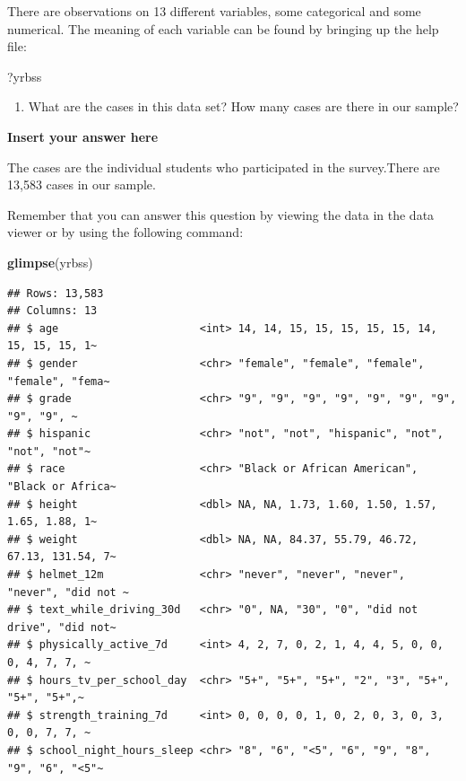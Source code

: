 \documentclass[
]{article}
\newenvironment{Shaded}{\begin{snugshade}}{\end{snugshade}}
\newcommand{\FunctionTok}[1]{\textcolor[rgb]{0.13,0.29,0.53}{\textbf{#1}}}
\newcommand{\NormalTok}[1]{#1}
\providecommand{\tightlist}{%
  \setlength{\itemsep}{0pt}\setlength{\parskip}{0pt}}
\begin{document}
There are observations on 13 different variables, some categorical and
some numerical. The meaning of each variable can be found by bringing up
the help file:

\begin{Shaded}
\begin{Highlighting}[]
\NormalTok{?yrbss}
\end{Highlighting}
\end{Shaded}

\begin{enumerate}
\def\labelenumi{\arabic{enumi}.}
\tightlist
\item
  What are the cases in this data set? How many cases are there in our
  sample?
\end{enumerate}

\textbf{Insert your answer here}

The cases are the individual students who participated in the
survey.There are 13,583 cases in our sample.

Remember that you can answer this question by viewing the data in the
data viewer or by using the following command:

\begin{Shaded}
\begin{Highlighting}[]
\FunctionTok{glimpse}\NormalTok{(yrbss)}
\end{Highlighting}
\end{Shaded}

\begin{verbatim}
## Rows: 13,583
## Columns: 13
## $ age                      <int> 14, 14, 15, 15, 15, 15, 15, 14, 15, 15, 15, 1~
## $ gender                   <chr> "female", "female", "female", "female", "fema~
## $ grade                    <chr> "9", "9", "9", "9", "9", "9", "9", "9", "9", ~
## $ hispanic                 <chr> "not", "not", "hispanic", "not", "not", "not"~
## $ race                     <chr> "Black or African American", "Black or Africa~
## $ height                   <dbl> NA, NA, 1.73, 1.60, 1.50, 1.57, 1.65, 1.88, 1~
## $ weight                   <dbl> NA, NA, 84.37, 55.79, 46.72, 67.13, 131.54, 7~
## $ helmet_12m               <chr> "never", "never", "never", "never", "did not ~
## $ text_while_driving_30d   <chr> "0", NA, "30", "0", "did not drive", "did not~
## $ physically_active_7d     <int> 4, 2, 7, 0, 2, 1, 4, 4, 5, 0, 0, 0, 4, 7, 7, ~
## $ hours_tv_per_school_day  <chr> "5+", "5+", "5+", "2", "3", "5+", "5+", "5+",~
## $ strength_training_7d     <int> 0, 0, 0, 0, 1, 0, 2, 0, 3, 0, 3, 0, 0, 7, 7, ~
## $ school_night_hours_sleep <chr> "8", "6", "<5", "6", "9", "8", "9", "6", "<5"~
\end{verbatim}
\end{document}
